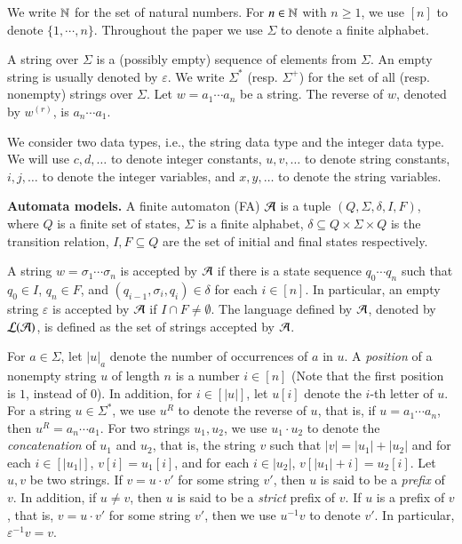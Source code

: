 
We write $\mathbb{N}$ for the set of natural numbers. For $n \in \mathbb{N}$ with $n \ge 1$, we use $[n]$ to denote $\{1, \cdots, n\}$. Throughout the paper we use $\Sigma$ to denote a  finite alphabet. 

A string over $\Sigma$ is a (possibly empty) sequence of elements from $\Sigma$. An empty string is usually denoted by $\varepsilon$. We write $\Sigma^*$ (resp. $\Sigma^+$) for the set of all (resp. nonempty) strings over $\Sigma$. Let $w=a_1\cdots a_n$ be a string. The reverse of $w$, denoted by $w^{(r)}$, is $a_n \cdots a_1$. 

We consider two data types, i.e., the string data type and the integer data type. We will use $c, d,\dots$ to denote integer constants, $u, v, \dots$ to denote string constants,  $i, j, \dots$ to denote the  integer variables, and $x, y, \dots$ to denote the string variables.

\noindent\textbf{Automata models.} A finite automaton (FA) $\mathcal{A}$ is a tuple $(Q, \Sigma, \delta, I, F)$, where $Q$ is a finite set of states, $\Sigma$ is a finite alphabet, $\delta \subseteq Q \times \Sigma \times Q$ is the transition relation, $I,F \subseteq Q$ are the set of initial and final states respectively. 

A string $w=\sigma_1 \cdots \sigma_n$ is accepted by $\mathcal{A}$ if there is a state sequence $q_0 \cdots q_n$ such that $q_0 \in I$, $q_n \in F$, and $(q_{i-1}, \sigma_i, q_i) \in \delta$ for each $i \in [n]$. In particular, an empty string $\varepsilon$ is accepted by $\mathcal{A}$ if $I \cap F \neq \emptyset$. The language defined by $\mathcal{A}$, denoted by $\mathcal{L}(\mathcal{A})$, is defined as the set of strings accepted by $\mathcal{A}$.

 
For $a \in \Sigma$, let $|u|_a$ denote the number of occurrences of $a$ in $u$. A \emph{position} of a nonempty string $u$ of length $n$ is a number $i \in [n]$ (Note that the first position is $1$, instead of  0). In addition, for $i \in [|u|]$, let $u[i]$ denote the $i$-th letter of $u$. For a string $u \in \Sigma^*$, we use $u^R$ to denote the reverse of $u$, that is, if $u = a_1 \cdots a_n$, then $u^R= a_n \cdots a_1$.
For two strings $u_1, u_2$, we use $u_1 \cdot u_2$ to denote the \emph{concatenation} of $u_1$ and $u_2$, that is, the string $v$ such that $|v|= |u_1| + |u_2|$ and for each $i \in [|u_1|]$, $v[i]= u_1[i]$, and for each $i \in |u_2|$, $v[|u_1|+i]=u_2[i]$. Let $u, v$ be two strings. If $v = u \cdot v'$ for some string $v'$, then $u$ is said to be a \emph{prefix} of $v$. In addition, if $u \neq v$, then $u$ is said to be a \emph{strict} prefix of $v$. If $u$ is a prefix of $v$, that is, $v = u \cdot v'$ for some string $v'$, then 
we use $u^{-1} v$ to denote $v'$. In particular, $\varepsilon^{-1} v = v$.

